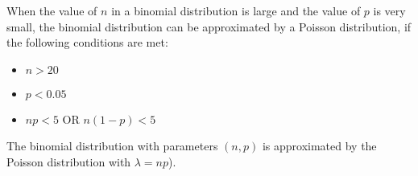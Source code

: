 

\begin{framed}
\noindent When the value of $n$ in a binomial distribution is large and the value of $p$ is very small, the binomial distribution can be approximated by a Poisson distribution, if the following conditions are met:
\begin{itemize}
    \item $n > 20$ 
        \item $p <0.05$
    \item $np < 5$ OR $n(1-p) < 5$

\end{itemize} 
The binomial distribution with parameters $(n, p)$ is approximated by the Poisson distribution with $\lambda = np$).
\end{framed}

